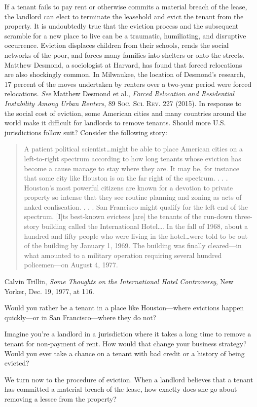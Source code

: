 If a tenant fails to pay rent or otherwise commits a material breach of the
lease, the landlord can elect to terminate the leasehold and evict the tenant
from the property.  It is undoubtedly true that the eviction process and the
subsequent scramble for a new place to live can be a traumatic, humiliating,
and disruptive occurrence.  Eviction displaces children from their schools,
rends the social networks of the poor, and forces many families into shelters
or onto the streets.  Matthew Desmond, a sociologist at Harvard, has found that
forced relocations are also shockingly common.  In Milwaukee, the location of
Desmond's research, 17 percent of the moves undertaken by renters over a
two-year period were forced relocations.  \textit{See} Matthew Desmond et al.,
\textit{Forced Relocation and Residential Instability Among Urban Renters}, 89
\textsc{Soc. Sci. Rev}. 227 (2015).  In response to the social cost of
eviction, some American cities and many countries around the world make it
difficult for landlords to remove tenants.  Should more U.S. jurisdictions
follow suit? Consider the following story:
\begin{quote}
A patient political scientist\dots might be able to place American cities on
a left-to-right spectrum according to how long tenants whose eviction has
become a cause manage to stay where they are.  It may be, for instance that
some city like Houston is on the far right of the spectrum. . . . Houston's
most powerful citizens are known for a devotion to private property so intense
that they see routine planning and zoning as acts of naked confiscation. . . .
San Francisco might qualify for the left end of the spectrum.  [I]ts best-known
evictees [are] the tenants of the run-down three-story building called the
International Hotel\ldots.  In the fall of 1968, about a hundred and fifty
people who were living in the hotel\ldots were told to be out of the building
by January 1, 1969.  The building was finally cleared---in what amounted to a
military operation requiring several hundred policemen---on August 4, 1977.  
\end{quote}
Calvin Trillin, \textit{Some Thoughts on the International Hotel Controversy},
New Yorker, Dec. 19, 1977, at 116.

\begin{questions}
\item Would you rather be a tenant in a place like Houston---where evictions
happen quickly---or in San Francisco---where they do not?  


\item Imagine you're a landlord in a jurisdiction where it takes a long time to
remove a tenant for non-payment of rent.  How would that change your business
strategy? Would you ever take a chance on a tenant with bad credit or a history
of being evicted? 
\end{questions}

We turn now to the procedure of eviction.  When a landlord believes that a
tenant has committed a material breach of the lease, how exactly does she go
about removing a lessee from the property? 

